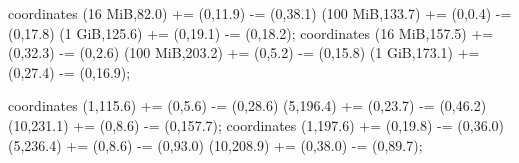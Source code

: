 coordinates {(16 MiB,82.0) += (0,11.9) -= (0,38.1)
               (100 MiB,133.7) += (0,0.4) -= (0,17.8)
               (1 GiB,125.6) += (0,19.1) -= (0,18.2)};
coordinates {(16 MiB,157.5) += (0,32.3) -= (0,2.6)
               (100 MiB,203.2) += (0,5.2) -= (0,15.8)
               (1 GiB,173.1) += (0,27.4) -= (0,16.9)};

coordinates {(1,115.6) += (0,5.6) -= (0,28.6)
               (5,196.4) += (0,23.7) -= (0,46.2)
               (10,231.1) += (0,8.6) -= (0,157.7)};
coordinates {(1,197.6) += (0,19.8) -= (0,36.0)
               (5,236.4) += (0,8.6) -= (0,93.0)
               (10,208.9) += (0,38.0) -= (0,89.7)};

